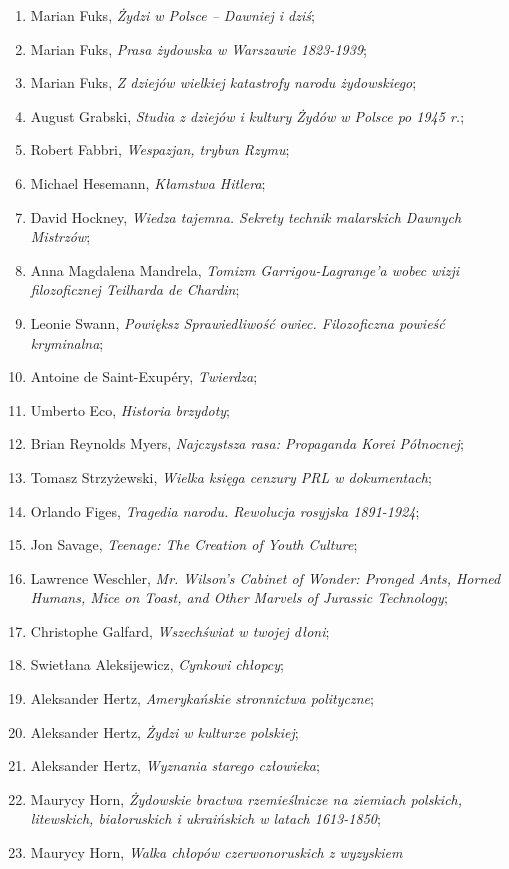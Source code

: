 \documentclass[a4paper,11pt]{article}
\begin{document}
\begin{enumerate}
\item Marian Fuks, \emph{Żydzi w Polsce – Dawniej i dziś};
\item Marian Fuks, \emph{Prasa żydowska w Warszawie 1823-1939};
\item Marian Fuks, \emph{Z dziejów wielkiej katastrofy narodu
    żydowskiego};
\item August Grabski, \emph{Studia z dziejów i kultury Żydów w Polsce
    po 1945 r.};
\item Robert Fabbri, \emph{Wespazjan, trybun Rzymu};
\item Michael Hesemann, \emph{Kłamstwa Hitlera};
\item David Hockney, \emph{Wiedza tajemna. Sekrety technik malarskich
    Dawnych Mistrzów};
\item Anna Magdalena Mandrela, \emph{Tomizm Garrigou-Lagrange’a wobec
    wizji filozoficznej Teilharda de Chardin};
\item Leonie Swann, \emph{Powiększ Sprawiedliwość owiec. Filozoficzna
    powieść kryminalna};
\item Antoine de Saint-Exupéry, \emph{Twierdza};
\item Umberto Eco, \emph{Historia brzydoty};
\item Brian Reynolds Myers, \emph{Najczystsza rasa: Propaganda Korei
    Północnej};
\item Tomasz Strzyżewski, \emph{Wielka księga cenzury PRL w
    dokumentach};
\item Orlando Figes, \emph{Tragedia narodu. Rewolucja rosyjska
    1891-1924};
\item Jon Savage, \emph{Teenage: The Creation of Youth Culture};
\item Lawrence Weschler, \emph{Mr. Wilson's Cabinet of Wonder: Pronged
    Ants, Horned Humans, Mice on Toast, and Other Marvels of Jurassic
    Technology};
\item Christophe Galfard, \emph{Wszechświat w twojej dłoni};
\item Swietłana Aleksijewicz, \emph{Cynkowi chłopcy};
\item Aleksander Hertz, \emph{Amerykańskie stronnictwa polityczne};
\item Aleksander Hertz, \emph{Żydzi w kulturze polskiej};
\item Aleksander Hertz, \emph{Wyznania starego człowieka};
\item Maurycy Horn, \emph{Żydowskie bractwa rzemieślnicze na ziemiach
    polskich, litewskich, białoruskich i ukraińskich w latach
    1613-1850};
\item Maurycy Horn, \emph{Walka chłopów czerwonoruskich z wyzyskiem
}
\end{enumerate}
\end{document}
